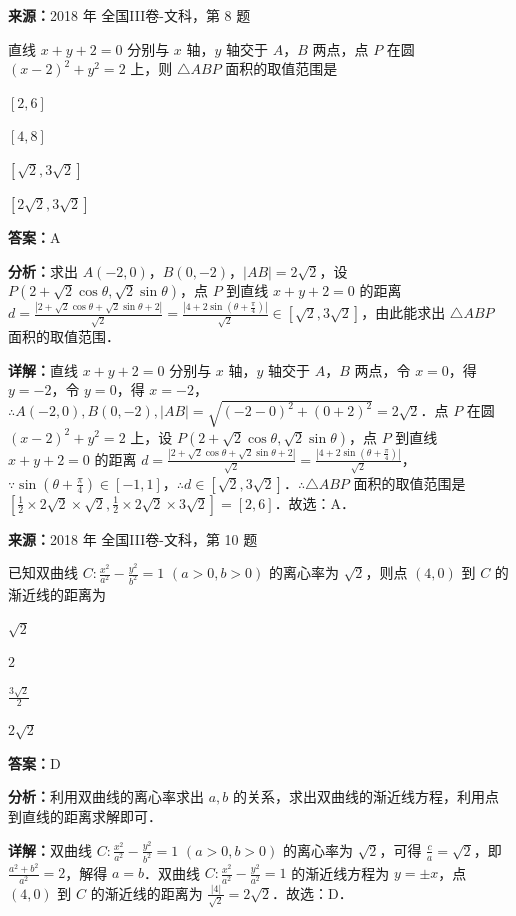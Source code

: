 \begin{question}[points=5]
\textbf{来源：}2018 年 全国III卷-文科，第 8 题\par
直线 $x+y+2=0$ 分别与 $x$ 轴，$y$ 轴交于 $A$，$B$ 两点，点 $P$ 在圆 $(x-2)^2+y^2=2$ 上，则 $\triangle ABP$ 面积的取值范围是
\begin{choices}
  \item $[2,6]$
  \item $[4,8]$
  \item $[\sqrt{2},3\sqrt{2}]$
  \item $[2\sqrt{2},3\sqrt{2}]$
\end{choices}
\begin{solution}
\textbf{答案：}A

\textbf{分析：}求出 $A(-2,0)$，$B(0,-2)$，$|AB|=2\sqrt{2}$，设 $P(2+\sqrt{2}\cos\theta,\sqrt{2}\sin\theta)$，点 $P$ 到直线 $x+y+2=0$ 的距离 $d=\frac{|2+\sqrt{2}\cos\theta+\sqrt{2}\sin\theta+2|}{\sqrt{2}}=\frac{|4+2\sin(\theta+\frac{\pi}{4})|}{\sqrt{2}}\in[\sqrt{2},3\sqrt{2}]$，由此能求出 $\triangle ABP$ 面积的取值范围．

\textbf{详解：}直线 $x+y+2=0$ 分别与 $x$ 轴，$y$ 轴交于 $A$，$B$ 两点，令 $x=0$，得 $y=-2$，令 $y=0$，得 $x=-2$，$\therefore A(-2,0),B(0,-2),|AB|=\sqrt{(-2-0)^2+(0+2)^2}=2\sqrt{2}$．点 $P$ 在圆 $(x-2)^2+y^2=2$ 上，设 $P(2+\sqrt{2}\cos\theta,\sqrt{2}\sin\theta)$，点 $P$ 到直线 $x+y+2=0$ 的距离 $d=\frac{|2+\sqrt{2}\cos\theta+\sqrt{2}\sin\theta+2|}{\sqrt{2}}=\frac{|4+2\sin(\theta+\frac{\pi}{4})|}{\sqrt{2}}$，$\because \sin(\theta+\frac{\pi}{4})\in[-1,1]$，$\therefore d\in[\sqrt{2},3\sqrt{2}]$．$\therefore \triangle ABP$ 面积的取值范围是 $[\frac{1}{2}\times 2\sqrt{2}\times \sqrt{2},\frac{1}{2}\times 2\sqrt{2}\times 3\sqrt{2}]=[2,6]$．故选：A．
\end{solution}
\end{question}

\begin{question}[points=5]
\textbf{来源：}2018 年 全国III卷-文科，第 10 题\par
已知双曲线 $C: \frac{x^2}{a^2}-\frac{y^2}{b^2}=1$ $ (a>0,b>0)$ 的离心率为 $\sqrt{2}$，则点 $(4,0)$ 到 $C$ 的渐近线的距离为
\begin{choices}
  \item $\sqrt{2}$
  \item $2$
  \item $\frac{3\sqrt{2}}{2}$
  \item $2\sqrt{2}$
\end{choices}
\begin{solution}
\textbf{答案：}D

\textbf{分析：}利用双曲线的离心率求出 $a,b$ 的关系，求出双曲线的渐近线方程，利用点到直线的距离求解即可．

\textbf{详解：}双曲线 $C: \frac{x^2}{a^2}-\frac{y^2}{b^2}=1$ $(a>0,b>0)$ 的离心率为 $\sqrt{2}$，可得 $\frac{c}{a}=\sqrt{2}$，即 $\frac{a^2+b^2}{a^2}=2$，解得 $a=b$．双曲线 $C: \frac{x^2}{a^2}-\frac{y^2}{a^2}=1$ 的渐近线方程为 $y=\pm x$，点 $(4,0)$ 到 $C$ 的渐近线的距离为 $\frac{|4|}{\sqrt{2}}=2\sqrt{2}$．故选：D．
\end{solution}
\end{question}

